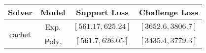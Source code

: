 \begin{tabular}{cc|c|c} 
\hline 
 Solver & Model & Support Loss  & Challenge Loss \tabularnewline\hline 
\hline 
\multirow{2}{*}{cachet} & Exp. & $\left[561.17,625.24\right]$ & $\left[3652.6,3806.7\right]$ \tabularnewline 
 & Poly. & $\left[561.7,626.05\right]$ & $\left[3435.4,3779.3\right]$ \tabularnewline 
\hline 
\end{tabular} 

